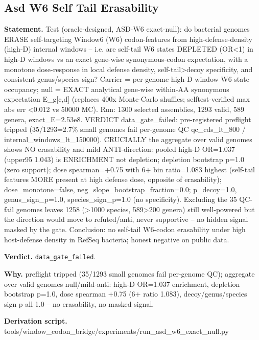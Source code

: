 \subsection{Asd W6 Self Tail Erasability}\label{sec:bridge-asd-w6-self-tail-erasability}
\textbf{Statement.} Test (oracle-designed, ASD-W6 exact-null): do bacterial genomes ERASE self-targeting Window6 (W6)
codon-features from high-defense-density (high-D) internal windows -- i.e. are self-tail W6 states
DEPLETED (OR<1) in high-D windows vs an exact gene-wise synonymous-codon expectation, with a
monotone dose-response in local defense density, self-tail>decoy specificity, and consistent
genus/species sign? Carrier = per-genome high-D window W6-state occupancy; null = EXACT analytical
gene-wise within-AA synonymous expectation E\_g[c,d] (replaces 400x Monte-Carlo shuffles;
selftest-verified max abs err <0.012 vs 50000 MC). Run: 1300 selected assemblies, 1293 valid, 589
genera, exact\_E=2.53e8. VERDICT data\_gate\_failed: pre-registered preflight tripped (35/1293=2.7\%
small genomes fail per-genome QC qc\_cds\_lt\_800 / internal\_windows\_lt\_150000). CRUCIALLY the
aggregate over valid genomes shows NO erasability and mild ANTI-direction: pooled high-D OR=1.037
(upper95 1.043) is ENRICHMENT not depletion; depletion bootstrap p=1.0 (zero support); dose
spearman=+0.75 with 6+ bin ratio=1.083 highest (self-tail features MORE present at high defense
dose, opposite of erasability); dose\_monotone=false, neg\_slope\_bootstrap\_fraction=0.0;
p\_decoy=1.0, genus\_sign\_p=1.0, species\_sign\_p=1.0 (no specificity). Excluding the 35 QC-fail
genomes leaves 1258 (>1000 species, 589>200 genera) still well-powered but the direction would move
to refuted/anti, never supportive -- no hidden signal masked by the gate. Conclusion: no self-tail
W6-codon erasability under high host-defense density in RefSeq bacteria; honest negative on public
data.

\textbf{Verdict.} \texttt{data\_gate\_failed}.

\textbf{Why.} preflight tripped (35/1293 small genomes fail per-genome QC); aggregate over valid genomes
null/mild-anti: high-D OR=1.037 enrichment, depletion bootstrap p=1.0, dose spearman +0.75 (6+ ratio
1.083), decoy/genus/species sign p all 1.0 -- no erasability, no masked signal.

\textbf{Derivation script.} tools/window\_codon\_bridge/experiments/run\_asd\_w6\_exact\_null.py

